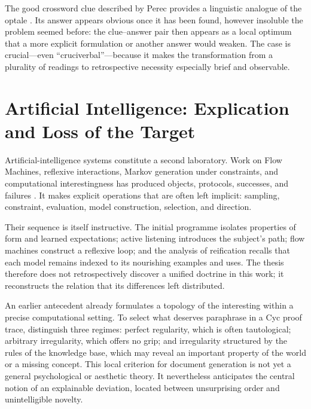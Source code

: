 \documentclass[11pt,a4paper]{article}
\begin{document}
The good crossword clue described by Perec provides a linguistic analogue of
the optale \parencite{perec1999motscroises}. Its answer appears obvious once it
has been found, however insoluble the problem seemed before: the clue--answer pair then
appears as a local optimum that a more explicit formulation or another answer
would weaken. The case is crucial---even ``cruciverbal''---because it makes the
transformation from a plurality of readings to retrospective necessity
especially brief and observable.

\section{Artificial Intelligence: Explication and Loss of the Target}

Artificial-intelligence systems constitute a second laboratory. Work on Flow
Machines, reflexive interactions, Markov generation under constraints, and
computational interestingness has produced objects, protocols, successes, and
failures
\parencite{pachet1999surprising,pachet1999active,pachet1999programs,pachet2000melodie,
pachet2002continuatorinteraction,pachet2004flowmachines,pachet2004reification,
pachet2004cybernetic,pachet2004childrenreflect,addessi2005experiments,
pachet2006clefs,pachet2006creativity,pachet2006reflective,pachet2008machines,
jones2009stimulating,pachet2006interactionsreflexives,addessi2006flowmachine,
aucouturier2002similarity,pachetroy2008hitsong,pachet2011hitsong,
lerch2011closedloop,
milipachet1995regularity,pachet2012virtuosity,martin2016creativeprocess,
pachet2021assisted,pachet2026markov}.
It makes explicit operations that are often left implicit: sampling,
constraint, evaluation, model construction, selection, and direction.

Their sequence is itself instructive. The initial programme isolates properties
of form and learned expectations; active listening introduces the subject's
path; flow machines construct a reflexive loop; and the analysis of reification
recalls that each model remains indexed to its nourishing examples and uses. The
thesis therefore does not retrospectively discover a unified doctrine in this
work; it reconstructs the relation that its differences left distributed.

An earlier antecedent already formulates a topology of the interesting within a
precise computational setting. To select what deserves paraphrase in a Cyc proof
trace, \textcite{milipachet1995regularity} distinguish three regimes: perfect
regularity, which is often tautological; arbitrary irregularity, which offers no
grip; and irregularity structured by the rules of the knowledge base, which may
reveal an important property of the world or a missing concept. This local
criterion for document generation is not yet a general psychological or
aesthetic theory. It nevertheless anticipates the central notion of an
explainable deviation, located between unsurprising order and unintelligible
novelty.
\end{document}
